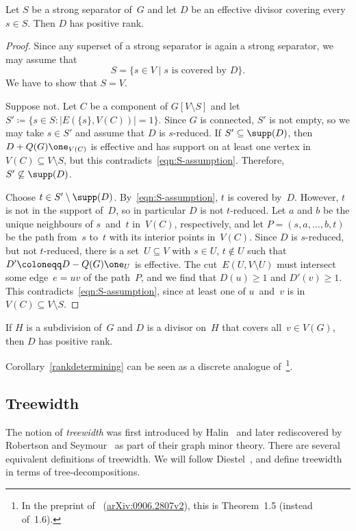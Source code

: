 \begin{lemma}\label{Luotype}
Let $S$ be a strong separator of~$G$ and let $D$ be an effective divisor covering every~$s\in S$. Then $D$ has positive rank. 
\end{lemma}
\begin{proof}
Since any superset of a strong separator is again a strong separator, we may assume that
\begin{equation}
	S=\{s\in V\mid \text{$s$ is covered by $D$}\}. \label{eqn:S-assumption}
\end{equation}
We have to show that $S=V$. 

Suppose not. Let $C$ be a component of $G[V\setminus S]$ and let $S'\coloneqq \{s\in S: |E(\{s\},V(C))|=1\}$. Since $G$ is connected, $S'$ is not empty, so we may take $s\in S'$ and assume that $D$ is $s$-reduced. If $S'\subseteq \supp(D)$, then $D+Q(G)\one_{V(C)}$ is effective and has support on at least one vertex in $V(C)\subseteq V\setminus S$, but this contradicts~\eqref{eqn:S-assumption}. Therefore, $S' \not\subseteq \supp(D)$. 

Choose $t\in S'\setminus \supp(D)$. By~\eqref{eqn:S-assumption}, $t$ is covered by~$D$. However, $t$ is not in the support of~$D$, so in particular $D$ is not $t$-reduced. Let $a$ and $b$ be the unique neighbours of $s$~and~$t$ in~$V(C)$, respectively, and let $P=(s,a,\ldots,b,t)$ be the path from~$s$ to~$t$ with its interior points in~$V(C)$. Since $D$ is $s$-reduced, but not $t$-reduced, there is a set~$U\subseteq V$ with $s\in U$, $t\not\in U$ such that $D'\coloneqq D-Q(G)\one_U$ is effective. The cut~$E(U,V\setminus U)$ must intersect some edge~$e=uv$ of the path~$P$, and we find that $D(u)\geq 1$ and $D'(v)\geq 1$. This contradicts~\eqref{eqn:S-assumption}, since at least one of $u$~and~$v$ is in~$V(C)\subseteq V\setminus S$.
\end{proof}

\begin{coro}
\label{rankdetermining}
If $H$ is a subdivision of~$G$ and $D$ is a divisor on~$H$ that covers all~$v\in V(G)$, then $D$ has positive rank.
\end{coro}

Corollary~\ref{rankdetermining} can be seen as a discrete analogue of~\cite[Theorem~1.6]{Luo2011}\footnote{In the preprint of~\cite{Luo2011} (\cf \href{https://arxiv.org/abs/0906.2807v2}{arXiv:0906.2807v2}), this is Theorem~1.5 (instead of~1.6).}.

\subsection{Treewidth}
The notion of \emph{treewidth} was first introduced by Halin~\cite{Halin1976} and later rediscovered by Robertson and Seymour~\cite{RobertsonSeymour1990} as part of their graph minor theory. There are several equivalent definitions of treewidth. We will follow Diestel~\cite{DiestelGraphTheory}, and define treewidth in terms of tree-decompositions.


